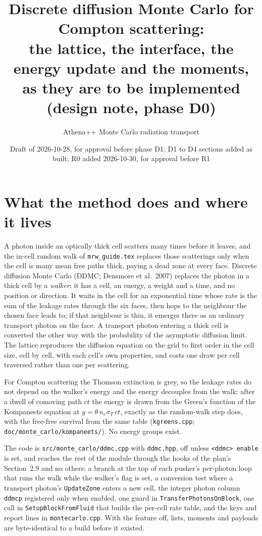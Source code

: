 \documentclass[11pt]{article}
\title{Discrete diffusion Monte Carlo for Compton scattering:\\
the lattice, the interface, the energy update and the moments,\\
as they are to be implemented (design note, phase D0)}
\author{Athena++ Monte Carlo radiation transport}
\date{Draft of 2026-10-28, for approval before phase D1; D1 to D4 sections added as built; R0 added 2026-10-30, for approval before R1}
\newcommand{\key}[1]{\texttt{#1}}
\begin{document}
\sloppy
\maketitle

\section{What the method does and where it lives}
\label{sec:what}

A photon inside an optically thick cell scatters many times before it leaves, and the
in-cell random walk of \texttt{mrw\_guide.tex} replaces those scatterings only when the
cell is many mean free paths thick, paying a dead zone at every face.  Discrete
diffusion Monte Carlo (DDMC; Densmore et al.\ 2007) replaces the photon in a thick cell
by a \emph{walker}: it has a cell, an energy, a weight and a time, and no
position or direction.  It waits in the cell for an exponential time whose rate is the
sum of the leakage rates through the six faces, then hops to the neighbour the chosen
face leads to; if that neighbour is thin, it emerges there as an ordinary transport
photon on the face.  A transport photon entering a thick cell is converted the other
way with the probability of the asymptotic diffusion limit.  The lattice reproduces the
diffusion equation on the grid to first order in the cell size, cell by cell, with each
cell's own properties, and costs one draw per cell traversed rather than one per
scattering.

For Compton scattering the Thomson extinction is grey, so the leakage rates do not
depend on the walker's energy and the energy decouples from the walk: after a dwell
of comoving path $ct$ the energy is drawn from the Green's function of the Kompaneets
equation at $y=\theta\,n_e\sigma_T\,ct$, exactly as the random-walk step does, with the
free-free survival from the same table (\texttt{kgreens.cpp};
\texttt{doc/monte\_carlo/kompaneets/}).  No energy groups exist.

The code is \texttt{src/monte\_carlo/ddmc.cpp} with \texttt{ddmc.hpp}, off unless
\key{<ddmc> enable} is set, and reaches the rest of the module through the hooks of
the plan's Section~2.9 and no others: a branch at the top of each pusher's per-photon
loop that runs the walk while the walker's flag is set, a conversion test where a
transport photon's \texttt{UpdateZone} enters a new cell, the integer photon column
\texttt{ddmcp} registered only when enabled, one guard in
\texttt{TransferPhotonsOnBlock}, one call in \texttt{SetupBlockFromFluid} that builds
the per-cell rate table, and the keys and report lines in \texttt{montecarlo.cpp}.
With the feature off, lists, moments and payloads are byte-identical to a build before
it existed.
\end{document}
